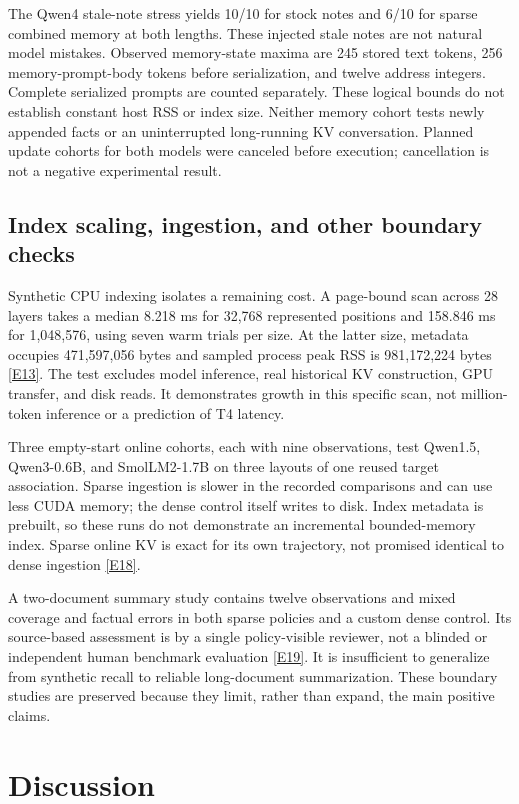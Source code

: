 \documentclass[11pt,letterpaper]{article}
\newcommand{\ev}[1]{\hyperref[app:evidence]{[E#1]}}
\begin{document}
The Qwen4 stale-note stress yields 10/10 for stock notes and 6/10 for sparse combined memory at both lengths. These injected stale notes are not natural model mistakes. Observed memory-state maxima are 245 stored text tokens, 256 memory-prompt-body tokens before serialization, and twelve address integers. Complete serialized prompts are counted separately. These logical bounds do not establish constant host RSS or index size. Neither memory cohort tests newly appended facts or an uninterrupted long-running KV conversation. Planned update cohorts for both models were canceled before execution; cancellation is not a negative experimental result.

\subsection{Index scaling, ingestion, and other boundary checks}
Synthetic CPU indexing isolates a remaining cost. A page-bound scan across 28 layers takes a median 8.218 ms for 32,768 represented positions and 158.846 ms for 1,048,576, using seven warm trials per size. At the latter size, metadata occupies 471,597,056 bytes and sampled process peak RSS is 981,172,224 bytes \ev{13}. The test excludes model inference, real historical KV construction, GPU transfer, and disk reads. It demonstrates growth in this specific scan, not million-token inference or a prediction of T4 latency.

Three empty-start online cohorts, each with nine observations, test Qwen1.5, Qwen3-0.6B, and SmolLM2-1.7B on three layouts of one reused target association. Sparse ingestion is slower in the recorded comparisons and can use less CUDA memory; the dense control itself writes to disk. Index metadata is prebuilt, so these runs do not demonstrate an incremental bounded-memory index. Sparse online KV is exact for its own trajectory, not promised identical to dense ingestion \ev{18}.

A two-document summary study contains twelve observations and mixed coverage and factual errors in both sparse policies and a custom dense control. Its source-based assessment is by a single policy-visible reviewer, not a blinded or independent human benchmark evaluation \ev{19}. It is insufficient to generalize from synthetic recall to reliable long-document summarization. These boundary studies are preserved because they limit, rather than expand, the main positive claims.

\section{Discussion}
\end{document}
